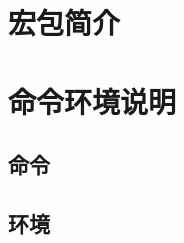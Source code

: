 \documentclass{xdyy-usermanual}
\begin{document}
\maketitle
\tableofcontents


\section{宏包简介}


\section{命令环境说明}


\subsection{命令}


\subsection{环境}
\end{document}

